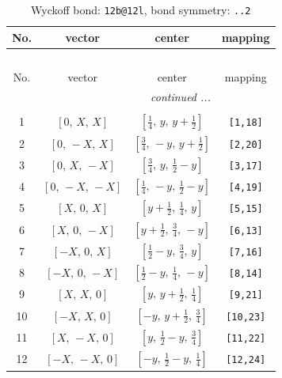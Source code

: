 \documentclass[fleqn,8pt]{jsarticle}
\begin{document}
\renewcommand{\arraystretch}{1.2}
\begin{longtable}{cccc}
\caption{Wyckoff bond: {\tt 12b@12l}, bond symmetry: {\tt ..2}}
 \\
 \hline \hline
No. & vector & center & mapping \\ \hline \endfirsthead

\multicolumn{3}{l}{\tablename\ \thetable{}} \\
 \hline \hline
No. & vector & center & mapping \\ \hline \endhead

 \hline \hline
\multicolumn{3}{r}{\footnotesize\it continued ...} \\ \endfoot

 \hline \hline
\multicolumn{3}{r}{} \\ \endlastfoot

1 & $\left[ 0,\, X,\, X \right]$ & $\left[ \frac{1}{4},\, y,\, y + \frac{1}{2} \right]$ & {\tt [1,18]} \\ \hline
2 & $\left[ 0,\, - X,\, X \right]$ & $\left[ \frac{3}{4},\, - y,\, y + \frac{1}{2} \right]$ & {\tt [2,20]} \\ \hline
3 & $\left[ 0,\, X,\, - X \right]$ & $\left[ \frac{3}{4},\, y,\, \frac{1}{2} - y \right]$ & {\tt [3,17]} \\ \hline
4 & $\left[ 0,\, - X,\, - X \right]$ & $\left[ \frac{1}{4},\, - y,\, \frac{1}{2} - y \right]$ & {\tt [4,19]} \\ \hline
5 & $\left[ X,\, 0,\, X \right]$ & $\left[ y + \frac{1}{2},\, \frac{1}{4},\, y \right]$ & {\tt [5,15]} \\ \hline
6 & $\left[ X,\, 0,\, - X \right]$ & $\left[ y + \frac{1}{2},\, \frac{3}{4},\, - y \right]$ & {\tt [6,13]} \\ \hline
7 & $\left[ - X,\, 0,\, X \right]$ & $\left[ \frac{1}{2} - y,\, \frac{3}{4},\, y \right]$ & {\tt [7,16]} \\ \hline
8 & $\left[ - X,\, 0,\, - X \right]$ & $\left[ \frac{1}{2} - y,\, \frac{1}{4},\, - y \right]$ & {\tt [8,14]} \\ \hline
9 & $\left[ X,\, X,\, 0 \right]$ & $\left[ y,\, y + \frac{1}{2},\, \frac{1}{4} \right]$ & {\tt [9,21]} \\ \hline
10 & $\left[ - X,\, X,\, 0 \right]$ & $\left[ - y,\, y + \frac{1}{2},\, \frac{3}{4} \right]$ & {\tt [10,23]} \\ \hline
11 & $\left[ X,\, - X,\, 0 \right]$ & $\left[ y,\, \frac{1}{2} - y,\, \frac{3}{4} \right]$ & {\tt [11,22]} \\ \hline
12 & $\left[ - X,\, - X,\, 0 \right]$ & $\left[ - y,\, \frac{1}{2} - y,\, \frac{1}{4} \right]$ & {\tt [12,24]} \\
\end{longtable}
\end{document}
